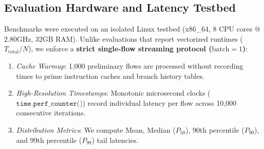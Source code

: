 \documentclass[conference]{IEEEtran}
\begin{document}
\begin{table}[t]
\caption{Operational Performance of the Tiered Cascaded Architecture Across Multiple Benchmarks}
\label{tab:cascaded_benchmarks}
\centering
{}
\end{table}

\subsection{Evaluation Hardware and Latency Testbed}
Benchmarks were executed on an isolated Linux testbed (x86\_64, 8 CPU cores @ 2.80GHz, 32GB RAM). Unlike evaluations that report vectorized runtimes ($T_{\text{total}}/N$), we enforce a \textbf{strict single-flow streaming protocol ($\text{batch}=1$)}:
\begin{enumerate}
    \item \textit{Cache Warmup}: 1,000 preliminary flows are processed without recording times to prime instruction caches and branch history tables.
    \item \textit{High-Resolution Timestamps}: Monotonic microsecond clocks ($\texttt{time.perf\_counter()}$) record individual latency per flow across 10,000 consecutive iterations.
    \item \textit{Distribution Metrics}: We compute Mean, Median ($P_{50}$), 90th percentile ($P_{90}$), and 99th percentile ($P_{99}$) tail latencies.
\end{enumerate}
\end{document}
